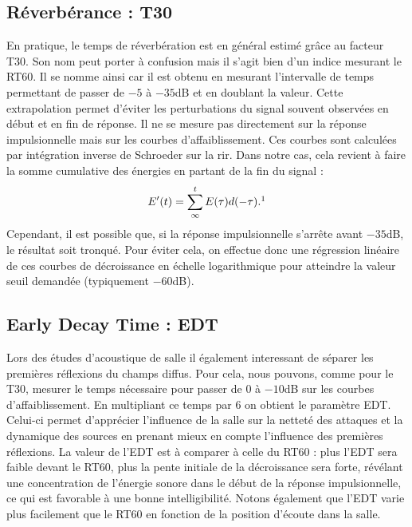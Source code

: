 \subsection{Réverbérance : \gls{T30}}
En pratique, le temps de réverbération est en général estimé grâce au facteur \gls{T30}. Son nom peut porter à confusion mais il s'agit bien d'un indice mesurant le \gls{RT60}. Il se nomme ainsi car il est obtenu en mesurant l’intervalle de temps permettant de passer de $-5$ à $-35$dB et en doublant la valeur. Cette extrapolation permet d’éviter les perturbations du signal souvent observées en début et en fin de réponse. Il ne se mesure pas directement sur la réponse impulsionnelle mais sur les courbes d'affaiblissement. Ces courbes sont calculées par intégration inverse de Schroeder \cite[p.410]{schroeder} sur la \gls{rir}. Dans notre cas, cela revient à faire la somme cumulative des énergies en partant de la fin du signal :
\begin{equation}
E'(t)=\sum_\infty^t E(\tau)d(-\tau). \footnotemark
\end{equation}
 Cependant, il est possible que, si la réponse impulsionnelle s'arrête avant $-35$dB, le résultat soit tronqué. Pour éviter cela, on effectue donc une régression linéaire de ces courbes de décroissance en échelle logarithmique pour atteindre la valeur seuil demandée (typiquement $-60$dB).

\subsection{Early Decay Time : \gls{EDT}}
Lors des études d'acoustique de salle il également interessant de séparer les premières réflexions du champs diffus. Pour cela, nous pouvons, comme pour le \gls{T30}, mesurer le temps nécessaire pour passer de $0$ à $-10$dB sur les courbes d'affaiblissement. En multipliant ce temps par 6 on obtient le paramètre \gls{EDT}. Celui-ci permet d’apprécier l’influence de la salle sur la netteté des attaques et la dynamique des sources en prenant mieux en compte  l’influence  des  premières  réflexions.  La  valeur  de  l’\gls{EDT}  est  à  comparer  à  celle  du \gls{RT60} : plus l’EDT sera faible devant le \gls{RT60}, plus la pente initiale de la décroissance sera forte, révélant  une  concentration  de  l’énergie  sonore  dans  le  début  de  la  réponse  impulsionnelle, ce qui est  favorable  à  une  bonne  intelligibilité.  Notons  également  que  l’\gls{EDT}  varie  plus  facilement  que  le  \gls{RT60} en fonction de la position d’écoute dans la salle.  

